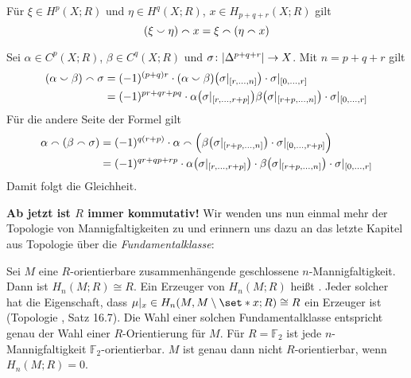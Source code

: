 \begin{lemma}[{name=[{Zusammenhang von Cup- und Cap-Produkt}]},label=lem:cup_n_cap]
	Für $\xi \in H^p(X;R)$ und $\eta \in H^q(X;R)$, $x \in H_{p+q+r}(X;R)$ gilt 
	\[
		\enbrace*{\xi \cupp \eta} \capp x = \xi \capp \enbrace*{\eta \capp x}
	\]
\end{lemma}
\begin{beweis}
	Sei $\alpha \in C^p(X;R)$, $\beta \in C^q(X;R)$ und $\sigma \colon \abs{\Delta^{p+q+r}}\to X$. Mit $n=p+q+r$ gilt
	\begin{align}
		\enbrace*{\alpha \cupp \beta} \capp \sigma &= (-1)^{(p+q)r} \cdot (\alpha \cupp \beta)\enbrace*{\sigma|_{\benbrace*{r,\ldots ,n}}} \cdot \sigma|_{\benbrace*{0,\ldots ,r}} \\
		&= (-1)^{pr+qr+pq} \cdot \alpha \enbrace*{\sigma|_{\benbrace*{r,\ldots ,r+p}}} \beta \enbrace*{\sigma|_{\benbrace*{r+p,\ldots ,n}}} \cdot \sigma|_{\benbrace*{0,\ldots ,r}}
	\end{align}
	Für die andere Seite der Formel gilt
	\begin{align}
		\alpha \capp (\beta \capp \sigma) &= (-1)^{q(r+p)} \cdot \alpha \capp \enbrace[\Big]{\beta \enbrace*{\sigma|_{\benbrace*{r+p,\ldots ,n}}} \cdot \sigma|_{\benbrace{0,\ldots ,r+p}}} \\
		&= (-1)^{qr+qp+rp} \cdot \alpha \enbrace*{\sigma|_{\benbrace*{r,\ldots,r+p}}} \cdot \beta \enbrace*{\sigma|_{\benbrace*{r+p,\ldots ,n}}} \cdot \sigma|_{\benbrace*{0,\ldots ,r}}
	\end{align}
	Damit folgt die Gleichheit.
\end{beweis}

\textbf{Ab jetzt ist $R$ immer kommutativ!} 
Wir wenden uns nun einmal mehr der Topologie von Mannigfaltigkeiten zu und erinnern uns dazu an das letzte Kapitel aus Topologie  über die \emph{Fundamentalklasse}:

\begin{erinnerungA}[{name=[Fundamentalklasse]}]
	Sei $M$ eine $R$-orientierbare zusammenhängende geschlossene $n$-Mannigfaltigkeit. 
	Dann ist $H_n(M;R) \cong R$.
	Ein Erzeuger von $H_n(M;R)$ heißt .
	Jeder solcher hat die Eigenschaft, dass $\mu|_x \in H_n(M,M \setminus \set*{x};R) \cong R$ ein Erzeuger ist (Topologie , Satz 16.7). 
	Die Wahl einer solchen Fundamentalklasse entspricht genau der Wahl einer $R$-Orientierung für $M$.
	Für $R=\mathbb{F}_2$ ist jede $n$-Mannigfaltigkeit $\mathbb{F}_2$-orientierbar. 
	$M$ ist genau dann nicht $R$-orientierbar, wenn $H_n(M;R)=0$.
\end{erinnerungA}

